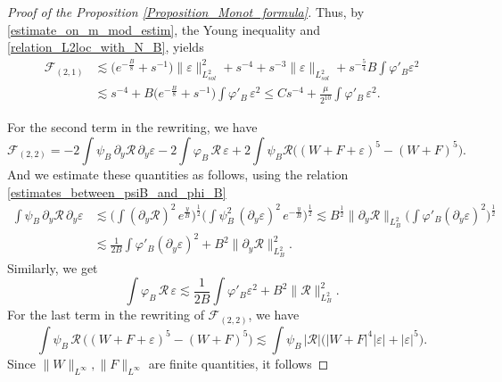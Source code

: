 \documentclass[16pt,english, oneside,reqno]{smfart}
\newcommand{\vare}{{\varepsilon}}
\newcommand{\vphi}{{\varphi}}
\begin{document}
\begin{proof}[Proof of the Proposition \ref{Proposition_Monot_formula}]
Thus, by \eqref{estimate_on_m_mod_estim}, the Young inequality and \eqref{relation_L2loc_with_N_B}, yields 
\begin{equation}
    \begin{split}
        \mathcal{F}_{(2,1)}
        & \lesssim \big( e^{-\frac{B}{8}} + s^{-1}\big)\|\vare\|^2_{L^2_{sol}} + s^{-4} + s^{-3}\|\vare\|_{L^2_{sol}} + s^{-\frac{5}{4}}B\int \vphi'_B \vare^2\\
        & \lesssim s^{-4} + B \big( e^{-\frac{B}{8}} + s^{-1}\big)\int \vphi'_B\,\vare^2 \leq Cs^{-4} + \frac{\mu}{2^{10}}\int \vphi'_B\,\vare^2.
    \end{split}
\end{equation}

For the second term in the rewriting, we have
\begin{equation}
    \mathcal{F}_{(2,2)}= -2 \int \psi_B\, \partial_y \mathcal{R}\, \partial_y \vare - 2 \int \vphi_B\, \mathcal{R}\, \vare + 2 \int \psi_B \mathcal{R} \big( (W+F+\vare)^5 - (W+F)^5 \big).
\end{equation}
And we estimate these quantities as follows, using the relation \eqref{estimates_between_psiB_and_phi_B}
\begin{equation}
\begin{split}
    \int \psi_B\, \partial_y \mathcal{R}\, \partial_y \vare 
    & \lesssim \Big( \int (\partial_y \mathcal{R})^2\, e^{\frac{y}{B}} \Big)^{\frac{1}{2}}\Big( \int \psi^2_B \,(\partial_y \vare)^2\, e^{-\frac{y}{B}} \Big)^{\frac{1}{2}} \lesssim B^{\frac{1}{2}} \|\partial_y \mathcal{R}\|_{L^2_B} \Big( \int \vphi'_B (\partial_y \vare)^2 \Big)^{\frac{1}{2}}\\
    & \lesssim \frac{1}{2B}\int \vphi'_B (\partial_y \vare)^2 + B^2\| \partial_y \mathcal{R}\|^2_{L^2_B}.
\end{split}
\end{equation}
Similarly, we get
\begin{equation}
    \int \vphi_B \, \mathcal{R}\, \vare \lesssim \frac{1}{2B}\int \vphi'_B \vare^2 + B^2\|\mathcal{R}\|^2_{L^2_B}.
\end{equation}
For the last term in the rewriting of $\mathcal{F}_{(2,2)}$, we have
\begin{equation}
    \int \psi_B \,\mathcal{R}\, \big( (W+F+\vare)^5 - (W+F)^5\big) \lesssim \int \psi_B \,|\mathcal{R}|\big( |W+F|^4 |\vare| + |\vare|^5 \big).
\end{equation}
Since $\|W\|_{L^{\infty}}, \|F\|_{L^{\infty}}$ are finite quantities, it follows

\end{proof}
\end{document}
